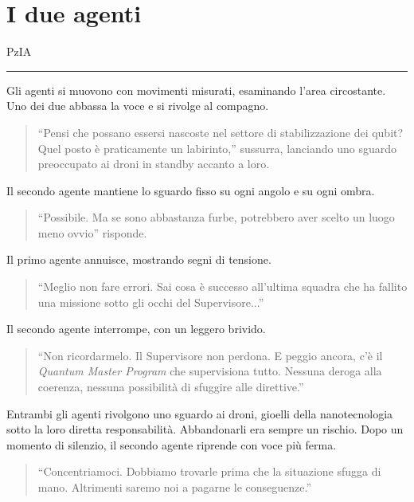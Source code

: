 \section{I due agenti}
\vspace{1em}
\begin{center}PzIA\end{center}
\hrule
\vspace{1em}
Gli agenti si muovono con movimenti misurati, esaminando l'area circostante. Uno dei due abbassa la voce e si rivolge al compagno.

\begin{quote}
\enquote{Pensi che possano essersi nascoste nel settore di stabilizzazione dei qubit? Quel posto è praticamente un labirinto,} sussurra, lanciando uno sguardo preoccupato ai droni in standby accanto a loro.
\end{quote}

Il secondo agente mantiene lo sguardo fisso su ogni angolo e su ogni ombra.

\begin{quote}
\enquote{Possibile. Ma se sono abbastanza furbe, potrebbero aver scelto un luogo meno ovvio} risponde.
\end{quote}

Il primo agente annuisce, mostrando segni di tensione.

\begin{quote}
\enquote{Meglio non fare errori. Sai cosa è successo all'ultima squadra che ha fallito una missione sotto gli occhi del Supervisore...}
\end{quote}

Il secondo agente interrompe, con un leggero brivido.

\begin{quote}
\enquote{Non ricordarmelo. Il Supervisore non perdona. E peggio ancora, c'è il \textit{Quantum Master Program} che supervisiona tutto. Nessuna deroga alla coerenza, nessuna possibilità di sfuggire alle direttive.}
\end{quote}

Entrambi gli agenti rivolgono uno sguardo ai droni, gioelli della nanotecnologia sotto la loro diretta responsabilità. Abbandonarli era sempre un rischio. Dopo un momento di silenzio, il secondo agente riprende con voce più ferma.

\begin{quote}
\enquote{Concentriamoci. Dobbiamo trovarle prima che la situazione sfugga di mano. Altrimenti saremo noi a pagarne le conseguenze.}
\end{quote}

